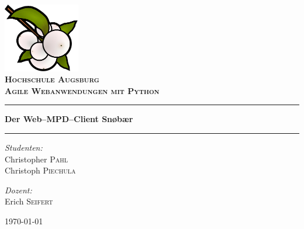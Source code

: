 \begin{titlepage}
\pagecolor{titlepagecolor}
\begin{center}

\bf
\includegraphics[width=0.25\textwidth]{docs/pics/logo.png}~\\[1cm]
\color{white}
\textsc{\huge Hochschule Augsburg}\\[1.5cm]
\textsc{\LARGE Agile Webanwendungen mit Python}\\[0.5cm]

\rule{\linewidth}{0.5mm}
{\Huge \bfseries Der Web--MPD--Client Snøbær\\[0.4cm] }
\rule{\linewidth}{0.5mm}

\noindent
\begin{minipage}[t]{0.4\textwidth}
\begin{flushleft} \Large
\emph{Studenten:}\\
\textnormal{Christopher \textsc{Pahl}\\Christoph \textsc{Piechula}}
\end{flushleft}
\end{minipage}%
\begin{minipage}[t]{0.4\textwidth}
\begin{flushright} \Large
\emph{Dozent:} \\
\textnormal{Erich \textsc{Seifert}}
\end{flushright}
\end{minipage}

\vfill

{\large \today}
\end{center}
\end{titlepage}
\nopagecolor
